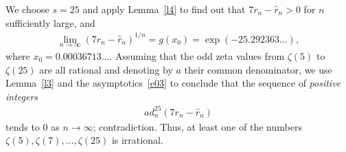 We choose $s=25$ and apply Lemma~\ref{l4} to find out that $7r_n-\hat r_n>0 $ for $n$ sufficiently large, and
\begin{gather*}
\lim_{n\to\infty}(7r_n-\hat r_n)^{1/n}=g(x_0)=\exp(-25.292363\dots),
\end{gather*}
where $x_0=0.00036713\dots$. Assuming that the odd zeta values from $\zeta(5)$ to $\zeta(25)$ are all rational and denoting by $a$ their common denominator, we use Lemma~\ref{l3} and the asymptotics~\eqref{e03} to conclude that the sequence of \emph{positive integers}
\begin{gather*}
ad_n^{25}(7r_n-\hat r_n)
\end{gather*}
tends to $0$ as $n\to\infty$; contradiction. Thus, at least one of the numbers $\zeta(5),\zeta(7),\dots,\allowbreak\zeta(25)$ is irrational.
